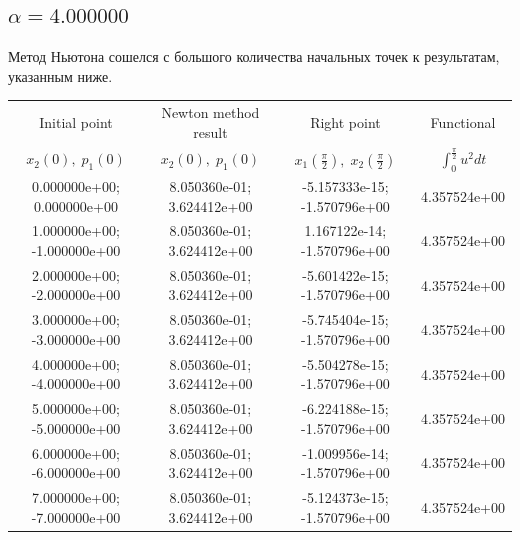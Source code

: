 \documentclass[titlepage]{article}
\def\l{\left}
\def\r{\right}
\begin{document}
\subsection{$\alpha = 4.000000$} 
Метод Ньютона сошелся с большого количества начальных точек к результатам, указанным ниже. \\ 
\begin{tabular}{ | c | c | c | c |} 
\hline 
Initial point  & Newton method result & Right point & Functional 
 \\ $x_2(0), \; p_1(0)$ & $x_2(0), \; p_1(0)$ & $x_1\l(\frac{\pi}{2}\r), \; x_2\l(\frac{\pi}{2}\r)$ & $\int_{0}^{\frac{\pi}{2}}u^2dt$  \\ \hline 
0.000000e+00; 0.000000e+00 & 8.050360e-01; 3.624412e+00 & -5.157333e-15; -1.570796e+00 & 4.357524e+00 \\ \hline 
1.000000e+00; -1.000000e+00 & 8.050360e-01; 3.624412e+00 & 1.167122e-14; -1.570796e+00 & 4.357524e+00 \\ \hline 
2.000000e+00; -2.000000e+00 & 8.050360e-01; 3.624412e+00 & -5.601422e-15; -1.570796e+00 & 4.357524e+00 \\ \hline 
3.000000e+00; -3.000000e+00 & 8.050360e-01; 3.624412e+00 & -5.745404e-15; -1.570796e+00 & 4.357524e+00 \\ \hline 
4.000000e+00; -4.000000e+00 & 8.050360e-01; 3.624412e+00 & -5.504278e-15; -1.570796e+00 & 4.357524e+00 \\ \hline 
5.000000e+00; -5.000000e+00 & 8.050360e-01; 3.624412e+00 & -6.224188e-15; -1.570796e+00 & 4.357524e+00 \\ \hline 
6.000000e+00; -6.000000e+00 & 8.050360e-01; 3.624412e+00 & -1.009956e-14; -1.570796e+00 & 4.357524e+00 \\ \hline 
7.000000e+00; -7.000000e+00 & 8.050360e-01; 3.624412e+00 & -5.124373e-15; -1.570796e+00 & 4.357524e+00 \\ \hline 
\end{tabular} 
\end{document}
